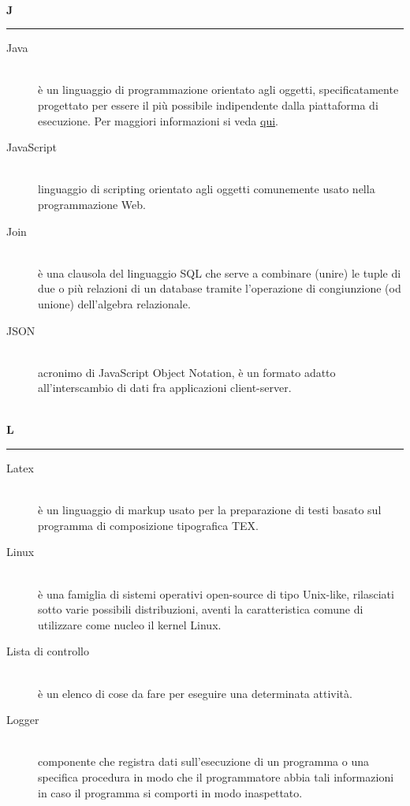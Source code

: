 \documentclass[12pt,a4paper]{article}
\begin{document}
\begin{center}
\hfill\\
	\LARGE \textbf{J}
\hfill\\
\rule[15pt]{30pt}{0.5pt}
\end{center}
\begin{description}
\item[Java] 
\hfill\\ è un linguaggio di programmazione orientato agli oggetti, specificatamente progettato per essere il più possibile indipendente dalla piattaforma di esecuzione. Per maggiori informazioni si veda \href{https://it.wikipedia.org/wiki/Java_(linguaggio_di_programmazione)}{qui}.

\item[JavaScript] 
\hfill\\ linguaggio di scripting orientato agli oggetti comunemente usato nella programmazione Web.

\item[Join] 
\hfill\\ è una clausola del linguaggio SQL che serve a combinare (unire) le tuple di due o più relazioni di un database tramite l'operazione di congiunzione (od unione) dell'algebra relazionale.

\item[JSON] 
\hfill\\ acronimo di JavaScript Object Notation, è un formato adatto all'interscambio di dati fra applicazioni client-server.
\end{description}

\newpage

\begin{center}
\hfill\\
	\LARGE \textbf{L}
\hfill\\
\rule[15pt]{30pt}{0.5pt}
\end{center}

\begin{description}
\item[Latex] 
\hfill\\ è un linguaggio di markup usato per la preparazione di testi basato sul programma di composizione tipografica TEX.

\item[Linux] 
\hfill\\ è una famiglia di sistemi operativi open-source di tipo Unix-like, rilasciati sotto varie possibili distribuzioni, aventi la caratteristica comune di utilizzare come nucleo il kernel Linux.

\item[Lista di controllo] 
\hfill\\ è un elenco di cose da fare per eseguire una determinata attività.

\item[Logger] 
\hfill\\componente che registra dati sull'esecuzione di un programma o una specifica procedura in modo che il programmatore abbia tali informazioni in caso il programma si comporti in modo inaspettato.
\end{description}
\end{document}
